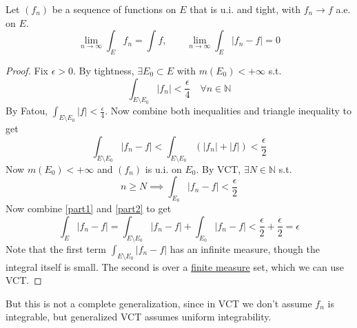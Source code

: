   \begin{theorem}
    \label{thm:generalized-vitali-convergence-theorem}
    Let $(f_n)$ be a sequence of functions on $E$ that is u.i. and tight, with $f_n \to f$ a.e. on $E$. 
    \begin{equation}
      \lim_{n \to \infty} \int_E f_n = \int f, \qquad \lim_{n \to \infty} \int_E |f_n - f| = 0
    \end{equation}
  \end{theorem}
  \begin{proof}
    Fix $\epsilon > 0$. By tightness, $\exists E_0 \subset E$ with $m(E_0) < +\infty$ s.t. 
    \begin{equation}
      \int_{E \setminus E_0} |f_n| < \frac{\epsilon}{4} \quad \forall n \in \mathbb{N}
    \end{equation}
    By Fatou, $\int_{E \setminus E_0} |f| < \frac{\epsilon}{4}$. Now combine both inequalities and triangle inequality to get 
    \begin{equation}
      \int_{E \setminus E_0} |f_n - f| < \int_{E \setminus E_0} (|f_n| + |f|) < \frac{\epsilon}{2} \label{part1}
    \end{equation}
    Now $m(E_0) < +\infty$ and $(f_n)$ is u.i. on $E_0$. By VCT, $\exists N \in \mathbb{N}$ s.t. 
    \begin{equation}
      n \geq N \implies \int_{E_0}  |f_n - f| < \frac{\epsilon}{2} \label{part2}
    \end{equation}
    Now combine \ref{part1} and \ref{part2} to get 
    \begin{equation}
      \int_{E} |f_n - f| = \int_{E \setminus E_0} |f_n - f| + \int_{E_0} |f_n - f| < \frac{\epsilon}{2} + \frac{\epsilon}{2} = \epsilon
    \end{equation}
    Note that the first term $\int_{E \setminus E_0} |f_n - f|$ has an infinite measure, though the integral itself is small. The second is over a \hyperref[def:finite-measure]{finite measure} set, which we can use VCT. 
  \end{proof}

  But this is not a complete generalization, since in VCT we don't assume $f_n$ is integrable, but generalized VCT assumes uniform integrability. 

